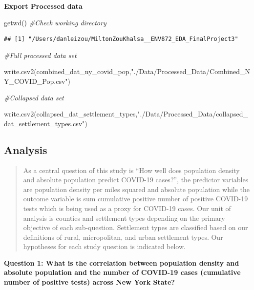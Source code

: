 \documentclass[
  12pt,
]{article}
\newenvironment{Shaded}{\begin{snugshade}}{\end{snugshade}}
\newcommand{\CommentTok}[1]{\textcolor[rgb]{0.56,0.35,0.01}{\textit{#1}}}
\newcommand{\FunctionTok}[1]{\textcolor[rgb]{0.00,0.00,0.00}{#1}}
\newcommand{\NormalTok}[1]{#1}
\newcommand{\StringTok}[1]{\textcolor[rgb]{0.31,0.60,0.02}{#1}}
\begin{document}
\textbf{Export Processed data}

\begin{Shaded}
\begin{Highlighting}[]
\FunctionTok{getwd}\NormalTok{() }\CommentTok{\#Check working directory}
\end{Highlighting}
\end{Shaded}

\begin{verbatim}
## [1] "/Users/danleizou/MiltonZouKhalsa__ENV872_EDA_FinalProject3"
\end{verbatim}

\begin{Shaded}
\begin{Highlighting}[]
\CommentTok{\#Full processed data set}

\FunctionTok{write.csv2}\NormalTok{(combined\_dat\_ny\_covid\_pop,}\StringTok{"./Data/Processed\_Data/Combined\_NY\_COVID\_Pop.csv"}\NormalTok{)}

\CommentTok{\#Collapsed data set}

\FunctionTok{write.csv2}\NormalTok{(collapsed\_dat\_settlement\_types,}\StringTok{"./Data/Processed\_Data/collapsed\_dat\_settlement\_types.csv"}\NormalTok{)}
\end{Highlighting}
\end{Shaded}

\newpage

\hypertarget{analysis}{%
\subsection{Analysis}\label{analysis}}

\begin{quote}
As a central question of this study is ``How well does population
density and absolute population predict COVID-19 cases?'', the predictor
variables are population density per miles squared and absolute
population while the outcome variable is sum cumulative positive number
of positive COVID-19 tests which is being used as a proxy for COVID-19
cases. Our unit of analysis is counties and settlement types depending
on the primary objective of each sub-question. Settlement types are
classified based on our definitions of rural, micropolitan, and urban
settlement types. Our hypotheses for each study question is indicated
below.
\end{quote}

\textbf{Question 1: What is the correlation between population density
and absolute population and the number of COVID-19 cases (cumulative
number of positive tests) across New York State?}
\end{document}
